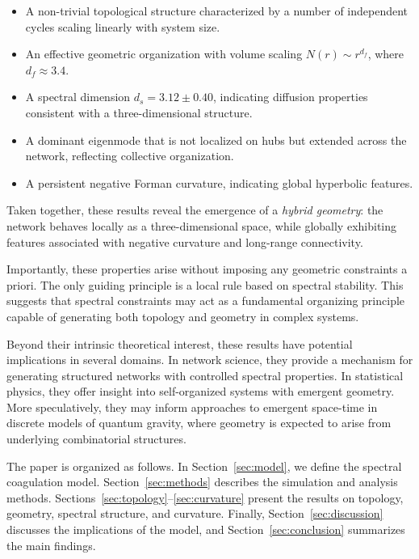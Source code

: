 \documentclass[11pt]{article}
\begin{document}
\begin{itemize}
    \item A non-trivial topological structure characterized by a number of
    independent cycles scaling linearly with system size.

    \item An effective geometric organization with volume scaling
    $N(r) \sim r^{d_f}$, where $d_f \approx 3.4$.

    \item A spectral dimension $d_s = 3.12 \pm 0.40$, indicating diffusion properties
    consistent with a three-dimensional structure.

    \item A dominant eigenmode that is not localized on hubs but extended
    across the network, reflecting collective organization.

    \item A persistent negative Forman curvature, indicating global
    hyperbolic features.

\end{itemize}

Taken together, these results reveal the emergence of a \emph{hybrid geometry}:
the network behaves locally as a three-dimensional space, while globally
exhibiting features associated with negative curvature and long-range
connectivity.

Importantly, these properties arise without imposing any geometric constraints
a priori. The only guiding principle is a local rule based on spectral stability.
This suggests that spectral constraints may act as a fundamental organizing
principle capable of generating both topology and geometry in complex systems.

Beyond their intrinsic theoretical interest, these results have potential
implications in several domains. In network science, they provide a mechanism
for generating structured networks with controlled spectral properties.
In statistical physics, they offer insight into self-organized systems with
emergent geometry. More speculatively, they may inform approaches to emergent
space-time in discrete models of quantum gravity, where geometry is expected
to arise from underlying combinatorial structures.

The paper is organized as follows. In Section~\ref{sec:model}, we define the
spectral coagulation model. Section~\ref{sec:methods} describes the simulation
and analysis methods. Sections~\ref{sec:topology}–\ref{sec:curvature} present
the results on topology, geometry, spectral structure, and curvature.
Finally, Section~\ref{sec:discussion} discusses the implications of the model,
and Section~\ref{sec:conclusion} summarizes the main findings.
\end{document}
